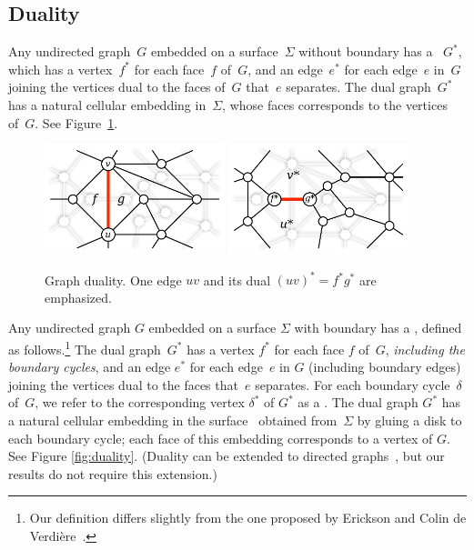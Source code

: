 \documentclass[letterpaper,review]{siamart190516}
\begin{document}
\subsection{Duality}

Any undirected graph~$G$ embedded on a surface~$\Sigma$ without boundary has a
~$G^*$, which has a vertex~$f^*$ for each face~$f$ of~$G$,
and an edge~$e^*$ for each edge~$e$ in~$G$ joining the vertices dual to the
faces of~$G$ that~$e$ separates. The dual graph~$G^*$ has a natural cellular
embedding in~$\Sigma$, whose faces corresponds to the vertices of~$G$.
See Figure~\ref{fig:prelims_primaldual}.

\begin{figure}[ht]
\centering
\includegraphics[height=1.25in]{Fig/primal}\quad
\includegraphics[height=1.25in]{Fig/dual}
\caption{Graph duality.  One edge $uv$ and its dual $(uv)^* =
f^*g^*$ are emphasized.} \label{fig:prelims_primaldual}
\end{figure}


Any undirected graph $G$ embedded on a surface $\Sigma$ with boundary has a , defined as follows.\footnote{Our definition differs slightly from the one proposed by Erickson and Colin de Verdière~\cite{ce-tnpcs-10}.}  The dual graph~$G^*$ has a vertex $f^*$ for each face $f$ of~$G$, \emph{including the boundary cycles}, and an edge $e^*$ for each edge~$e$ in $G$ (including boundary edges) joining the vertices dual to the faces that~$e$ separates.  For each boundary cycle~$\delta$ of~$G$, we refer to the corresponding vertex $\delta^*$ of $G^*$ as a .  The dual graph $G^*$ has a natural cellular embedding in the surface~\EMPH{$\Sigma^\bullet$} obtained from~$\Sigma$ by gluing a disk to each boundary cycle; each face of this embedding corresponds to a vertex of $G$.  See Figure \ref{fig:duality}.  (Duality can be extended to directed graphs~\cite{cen-hfcc-12}, but our results do not require this extension.)
\end{document}

